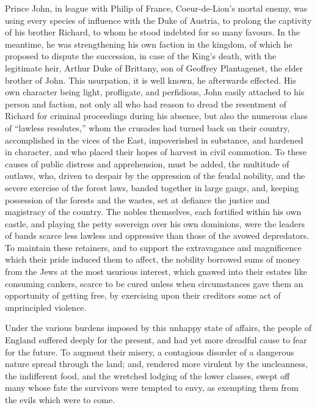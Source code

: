 Prince John, in league with Philip of France, Coeur-de-Lion's mortal
enemy, was using every species of influence with the Duke of Austria, to
prolong the captivity of his brother Richard, to whom he stood indebted
for so many favours. In the meantime, he was strengthening his own
faction in the kingdom, of which he proposed to dispute the succession,
in case of the King's death, with the legitimate heir, Arthur Duke of
Brittany, son of Geoffrey Plantagenet, the elder brother of John. This
usurpation, it is well known, he afterwards effected. His own character
being light, profligate, and perfidious, John easily attached to his
person and faction, not only all who had reason to dread the resentment
of Richard for criminal proceedings during his absence, but also the
numerous class of ``lawless resolutes,'' whom the crusades had turned
back on their country, accomplished in the vices of the East,
impoverished in substance, and hardened in character, and who placed
their hopes of harvest in civil commotion. To these causes of public
distress and apprehension, must be added, the multitude of outlaws, who,
driven to despair by the oppression of the feudal nobility, and the
severe exercise of the forest laws, banded together in large gangs, and,
keeping possession of the forests and the wastes, set at defiance the
justice and magistracy of the country. The nobles themselves, each
fortified within his own castle, and playing the petty sovereign over
his own dominions, were the leaders of bands scarce less lawless and
oppressive than those of the avowed depredators. To maintain these
retainers, and to support the extravagance and magnificence which their
pride induced them to affect, the nobility borrowed sums of money from
the Jews at the most usurious interest, which gnawed into their estates
like consuming cankers, scarce to be cured unless when circumstances
gave them an opportunity of getting free, by exercising upon their
creditors some act of unprincipled violence.

Under the various burdens imposed by this unhappy state of affairs, the
people of England suffered deeply for the present, and had yet more
dreadful cause to fear for the future. To augment their misery, a
contagious disorder of a dangerous nature spread through the land; and,
rendered more virulent by the uncleanness, the indifferent food, and the
wretched lodging of the lower classes, swept off many whose fate the
survivors were tempted to envy, as exempting them from the evils which
were to come.

